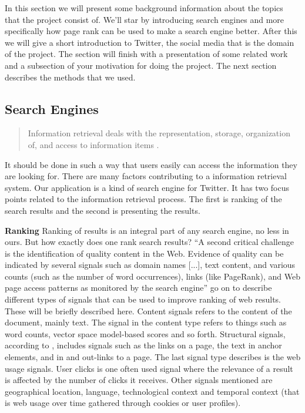 In this section we will present some background information about the topics that the project consist of. We'll star by introducing search engines and more specifically how page rank can be used to make a search engine better. After this we will give a short introduction to Twitter, the social media that is the domain of the project. The section will finish with a presentation of some related work and a subsection of your motivation for doing the project. The next section describes the methods that we used.


\subsection{Search Engines} 
\begin{quote}Information retrieval deals with the representation, storage, organization of, and access to information items \citep[p.1]{Baeza-Yates2011}.\end{quote} It should be done in such a way that users easily can access the information they are looking for. There are many factors contributing to a information retrieval system. Our application is a kind of search engine for Twitter. It has two focus points related to the information retrieval process. The first is ranking of the search results and the second is presenting the results.  %


{\bf Ranking}
Ranking of results is an integral part of any search engine, no less in ours. But how exactly does one rank search results? “A second critical challenge is the identification of quality content in the Web. Evidence of quality can be indicated by several signals such as domain names [...], text content, and various counts (such as the number of word occurrences), links (like PageRank), and Web page access patterns as monitored by the search engine” \citep[p.468]{Baeza-Yates2011}
\citet{Baeza-Yates2011} go on to describe different types of signals that can be used to improve ranking of web results. These will be briefly described here. Content signals refers to the content of the document, mainly text. The signal in the content type refers to things such as word counts, vector space model-based scores and so forth. Structural signals, according to \citet{Baeza-Yates2011}, includes signals such as the links on a page, the text in anchor elements, and in and out-links to a page. The last signal type describes is the web usage signals. User clicks is one often used signal where the relevance of a result is affected by the number of clicks it receives. Other signals mentioned are geographical location, language, technological context and temporal context (that is web usage over time gathered through cookies or user profiles)\citep{Baeza-Yates2011}.

